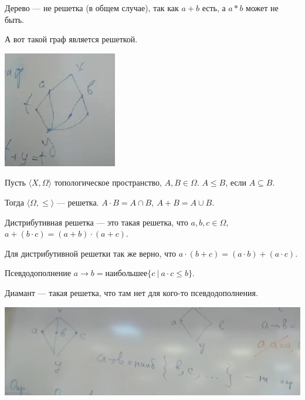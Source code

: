 \begin{example}
    Дерево --- не решетка (в общем случае), так как $a + b$ есть, а $a*b$ может не быть.

    А вот такой граф является решеткой.

    \includegraphics[scale=1]{img/grid_graph.png}
\end{example}

\begin{theorem}
    Пусть $\langle X, \Omega \rangle$ топологическое пространство, $A, B \in \Omega$. $A \leqslant B$, если $A \subseteq B$.

    Тогда $\langle \Omega, \leqslant\rangle$ --- решетка. $A \cdot B = A \cap B, ~ A + B = A \cup B$.
\end{theorem}

\begin{definition}
    Дистрибутивная решетка --- это такая решетка, что $a,b,c \in \Omega$, ~$a + (b \cdot c) = (a + b) \cdot (a + c)$.
\end{definition}

\begin{lemma}
    Для дистрибутивной решетки так же верно, что $a \cdot (b + c) = (a \cdot b) + (a \cdot c)$.
\end{lemma}

\begin{definition}
    Псевдодополнение $a \to b = \text{наибольшее} \{ c ~|~ a \cdot c \leqslant b\}$.
\end{definition}

\begin{definition}
    Диамант --- такая решетка, что там нет для кого-то псевдодополнения.

    \begin{center}
        \includegraphics[scale=0.8]{img/topology_diomant}
    \end{center}
\end{definition}

